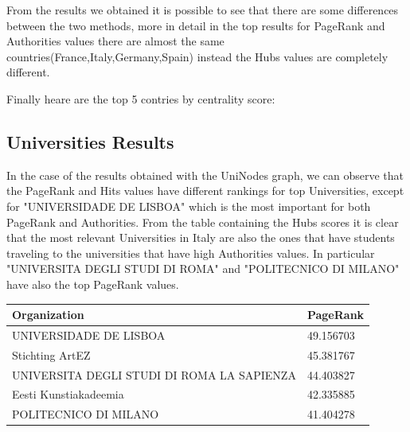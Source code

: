     From the results we obtained it is possible to see that there are some differences between the two methods,
    more in detail in the top results for PageRank and Authorities values there are almost the same countries(France,Italy,Germany,Spain)
     instead the Hubs values are completely different.
    
    Finally heare are the top 5 contries by centrality score:

    \subsection*{Universities Results}
    In the case of the results obtained with the UniNodes graph, we can observe that the PageRank and Hits values 
    have different rankings for top Universities, except for "UNIVERSIDADE DE LISBOA" which is the most important
    for both PageRank and Authorities.
    From the table containing the Hubs scores it is clear that the most relevant Universities in Italy are also the 
    ones that have students traveling to the universities that have high Authorities values. 
    In particular "UNIVERSITA DEGLI STUDI DI ROMA" and "POLITECNICO DI MILANO" have also the top PageRank values.    
    \begin{table}[hbtp]
      \parbox{.25\linewidth}{
        \centering
        \begin{tabular}{l l}
            \hline
            \textbf{Organization} & \textbf{PageRank} \\ \hline
            UNIVERSIDADE DE LISBOA & 49.156703 \\
            Stichting ArtEZ & 45.381767 \\
            UNIVERSITA DEGLI STUDI DI ROMA LA SAPIENZA & 44.403827 \\
            Eesti Kunstiakadeemia & 42.335885 \\
            POLITECNICO DI MILANO & 41.404278\\\hline
          \end{tabular}
          \label{tab:table-label}
        }
      \end{table}

